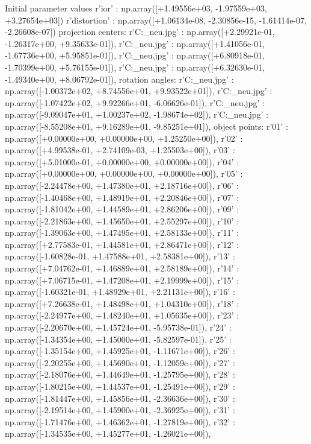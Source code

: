 Initial parameter values
r'ior' : np.array([+1.49556e+03, -1.97559e+03, +3.27654e+03])
r'distortion' : np.array([+1.06134e-08, -2.30856e-15, -1.61414e-07, -2.26608e-07])
projection centers:
r'C:\Users\Clemens\Desktop\fotos_neu\1.jpg' : np.array([+2.29921e-01, -1.26317e+00, +9.35633e-01]),
r'C:\Users\Clemens\Desktop\fotos_neu\2.jpg' : np.array([+1.41056e-01, -1.67736e+00, +5.95851e-01]),
r'C:\Users\Clemens\Desktop\fotos_neu\3.jpg' : np.array([+6.80918e-01, -1.70399e+00, +5.76155e-01]),
r'C:\Users\Clemens\Desktop\fotos_neu\4.jpg' : np.array([+6.32630e-01, -1.49340e+00, +8.06792e-01]),
rotation angles:
r'C:\Users\Clemens\Desktop\fotos_neu\1.jpg' : np.array([-1.00372e+02, +8.74556e+01, +9.93522e+01]),
r'C:\Users\Clemens\Desktop\fotos_neu\2.jpg' : np.array([-1.07422e+02, +9.92266e+01, -6.06626e-01]),
r'C:\Users\Clemens\Desktop\fotos_neu\3.jpg' : np.array([-9.09047e+01, +1.00237e+02, -1.98674e+02]),
r'C:\Users\Clemens\Desktop\fotos_neu\4.jpg' : np.array([-8.55208e+01, +9.16289e+01, -9.85251e+01]),
object points:
r'01' : np.array([+0.00000e+00, +0.00000e+00, +1.25250e+00]),
r'02' : np.array([+4.99538e-01, +2.74109e-03, +1.25503e+00]),
r'03' : np.array([+5.01000e-01, +0.00000e+00, +0.00000e+00]),
r'04' : np.array([+0.00000e+00, +0.00000e+00, +0.00000e+00]),
r'05' : np.array([-2.24478e+00, +1.47380e+01, +2.18716e+00]),
r'06' : np.array([-1.40468e+00, +1.48919e+01, +2.20846e+00]),
r'07' : np.array([-1.81042e+00, +1.44589e+01, +2.86206e+00]),
r'09' : np.array([-2.21863e+00, +1.45650e+01, +2.55297e+00]),
r'10' : np.array([-1.39063e+00, +1.47495e+01, +2.58133e+00]),
r'11' : np.array([+2.77583e-01, +1.44581e+01, +2.86471e+00]),
r'12' : np.array([-1.60828e-01, +1.47588e+01, +2.58381e+00]),
r'13' : np.array([+7.04762e-01, +1.46889e+01, +2.58189e+00]),
r'14' : np.array([+7.06715e-01, +1.47208e+01, +2.19999e+00]),
r'15' : np.array([-1.60321e-01, +1.48929e+01, +2.21131e+00]),
r'16' : np.array([+7.26638e-01, +1.48498e+01, +1.04310e+00]),
r'18' : np.array([-2.24977e+00, +1.48240e+01, +1.05635e+00]),
r'23' : np.array([-2.20670e+00, +1.45724e+01, -5.95738e-01]),
r'24' : np.array([-1.34354e+00, +1.45000e+01, -5.82597e-01]),
r'25' : np.array([-1.35154e+00, +1.45925e+01, -1.11671e+00]),
r'26' : np.array([-2.20255e+00, +1.45690e+01, -1.12059e+00]),
r'27' : np.array([-2.18076e+00, +1.44649e+01, -1.25795e+00]),
r'28' : np.array([-1.80215e+00, +1.44537e+01, -1.25491e+00]),
r'29' : np.array([-1.81447e+00, +1.45856e+01, -2.36636e+00]),
r'30' : np.array([-2.19514e+00, +1.45900e+01, -2.36925e+00]),
r'31' : np.array([-1.71476e+00, +1.46362e+01, -1.27819e+00]),
r'32' : np.array([-1.34535e+00, +1.45277e+01, -1.26021e+00]),
